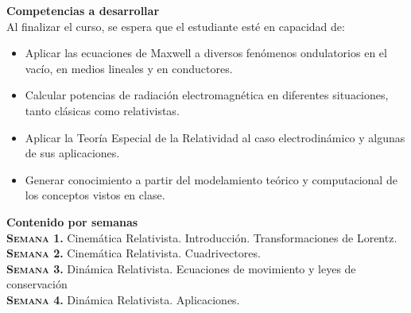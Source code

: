 \documentclass[letterpaper,10pt,onecolumn]{article}
\begin{document}
\noindent\textbf{\large {} \quad Competencias a
  desarrollar}\\[-0.2cm] 


\noindent\normalsize Al finalizar el curso, se espera que el
estudiante est\'e en capacidad de: 

\begin{itemize}
	\item Aplicar las ecuaciones de Maxwell a diversos fen\'omenos
          ondulatorios en el vac\'io, en medios lineales y en
          conductores.\\[-0.6cm]
	\item Calcular potencias de radiaci\'on electromagn\'etica en
          diferentes situaciones, tanto cl\'asicas como
          relativistas.\\[-0.6cm] 
	\item Aplicar la Teor\'ia Especial de la Relatividad al caso
          electrodin\'amico y algunas de sus aplicaciones.\\[-0.6cm] 
	\item Generar conocimiento a partir del modelamiento te\'orico
          y computacional de los conceptos vistos en clase.\\[-0.2cm] 
\end{itemize}

\noindent\textbf{\large {} \quad Contenido por
  semanas}\\[-0.2cm] 



\noindent\normalsize\textbf{\textsc{Semana 1.}} Cinem\'atica
Relativista. Introducci\'on. Transformaciones de Lorentz.\\[-0.3cm]   

\noindent\textbf{\textsc{Semana 2.}} Cinem\'atica
Relativista. Cuadrivectores. \\[-0.3cm]   

\noindent\textbf{\textsc{Semana 3.}} Din\'amica 
Relativista. Ecuaciones de movimiento y leyes de conservaci\'on
\\[-0.3cm]  

\noindent\textbf{\textsc{Semana 4.}} Din\'amica 
Relativista. Aplicaciones. \\[-0.3cm]  
\end{document}
